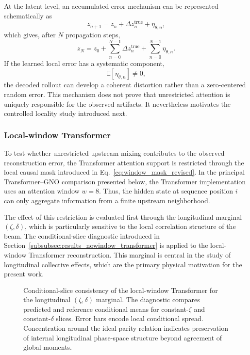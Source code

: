 At the latent level, an accumulated error mechanism can be represented schematically as
\begin{equation}
z_{n+1}
=
z_n
+
\Delta z_n^{\mathrm{true}}
+
\eta_{\theta,n},
\end{equation}
which gives, after \(N\) propagation steps,
\begin{equation}
z_N
=
z_0
+
\sum_{n=0}^{N-1}
\Delta z_n^{\mathrm{true}}
+
\sum_{n=0}^{N-1}
\eta_{\theta,n}.
\label{eq:latent_error_accumulation}
\end{equation}
If the learned local error has a systematic component,
\begin{equation}
\mathbb{E}
\left[
\eta_{\theta,n}
\right]
\neq 0,
\end{equation}
the decoded rollout can develop a coherent distortion rather than a zero-centered random error. This mechanism does not prove that unrestricted attention is uniquely responsible for the observed artifacts. It nevertheless motivates the controlled locality study introduced next.

\subsubsection{Local-window Transformer}
\label{subsubsec:results_window_transformer}

To test whether unrestricted upstream mixing contributes to the observed reconstruction error, the Transformer attention support is restricted through the local causal mask introduced in Eq.~\eqref{eq:window_mask_revised}. In the principal Transformer--GNO comparison presented below, the Transformer implementation uses an attention window $w=8$. Thus, the hidden state at sequence position \(i\) can only aggregate information from a finite upstream neighborhood.

The effect of this restriction is evaluated first through the longitudinal marginal $(\zeta,\delta)$, which is particularly sensitive to the local correlation structure of the beam. The conditional-slice diagnostic introduced in Section~\ref{subsubsec:results_nowindow_transformer} is applied to the local-window Transformer reconstruction. This marginal is central in the study of longitudinal collective effects, which are the primary physical motivation for the present work.

\begin{figure}[h!]
\centering
{}
\caption{
Conditional-slice consistency of the local-window Transformer for the longitudinal \((\zeta,\delta)\) marginal. The diagnostic compares predicted and reference conditional means for constant-\(\zeta\) and constant-\(\delta\) slices. Error bars encode local conditional spread. Concentration around the ideal parity relation indicates preservation of internal longitudinal phase-space structure beyond agreement of global moments.
}
\label{fig:tf_conditionals_longitudinal}
\end{figure}

